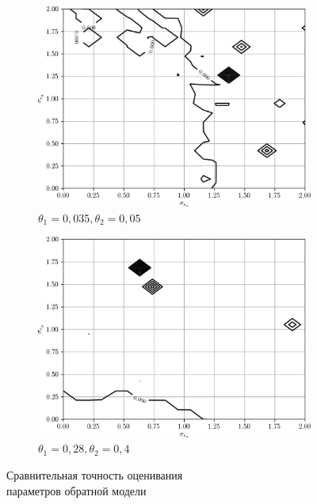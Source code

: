 \begin{figure}[p]
  \begin{subfigure}[b]{\linewidth}
    \centering
    \includegraphics[width=135mm]{fig/nonlinear/inverse/a-0_b-0,035_c-0,005.png}
    \caption{\( \theta_1 = 0{,}035, \theta_2 = 0{,}05 \)}
  \end{subfigure}

  \vspace{2\baselineskip}
  \begin{subfigure}[b]{\linewidth}
    \centering
    \includegraphics[width=135mm]{fig/nonlinear/inverse/a-0_b-0,28_c-0,04.png}
    \caption{\( \theta_1 = 0{,}28, \theta_2 = 0{,}4 \)}
  \end{subfigure}

  \vspace{\baselineskip}
  \caption{
    Сравнительная точность оценивания \\
    параметров обратной модели
  }\label{fig:comparison_nonlinear_inverse}
\end{figure}


